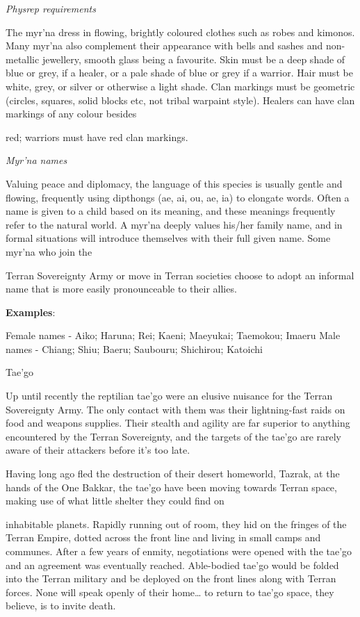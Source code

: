 \documentclass{scrbook}
\begin{document}
\textit{Physrep requirements}

The myr'na dress in flowing, brightly coloured clothes such as robes and kimonos. Many myr'na also complement their appearance with bells and sashes and non-metallic jewellery, smooth glass being a favourite. Skin must be a deep shade of blue or grey, if a healer, or a pale shade of blue or grey if a warrior. Hair must be white, grey, or silver or otherwise a light shade. Clan markings must be geometric (circles, squares, solid blocks etc, not tribal warpaint style). Healers can have clan markings of any colour besides

red; warriors must have red clan markings.

\textit{Myr'na names}

Valuing peace and diplomacy, the language of this species is usually gentle and flowing, frequently using dipthongs (ae, ai, ou, ae, ia) to elongate words. Often a name is given to a child based on its meaning, and these meanings frequently refer to the natural world. A myr'na deeply values his/her family name, and in formal situations will introduce themselves with their full given name. Some myr'na who join the

Terran Sovereignty Army or move in Terran societies choose to adopt an informal name that is more easily pronounceable to their allies.

\textbf{Examples}:

Female names - Aiko; Haruna; Rei; Kaeni; Maeyukai; Taemokou; Imaeru Male names - Chiang; Shiu; Baeru; Saubouru; Shichirou; Katoichi

Tae'go

Up until recently the reptilian tae'go were an elusive nuisance for the Terran Sovereignty Army. The only contact with them was their lightning-fast raids on food and weapons supplies. Their stealth and agility are far superior to anything encountered by the Terran Sovereignty, and the targets of the tae'go are rarely aware of their attackers before it's too late.

Having long ago fled the destruction of their desert homeworld, Tazrak, at the hands of the One Bakkar, the tae'go have been moving towards Terran space, making use of what little shelter they could find on

inhabitable planets. Rapidly running out of room, they hid on the fringes of the Terran Empire, dotted across the front line and living in small camps and communes. After a few years of enmity, negotiations were opened with the tae'go and an agreement was eventually reached. Able-bodied tae'go would be folded into the Terran military and be deployed on the front lines along with Terran forces. None will speak openly of their home{\dots} to return to tae'go space, they believe, is to invite death.
\end{document}
